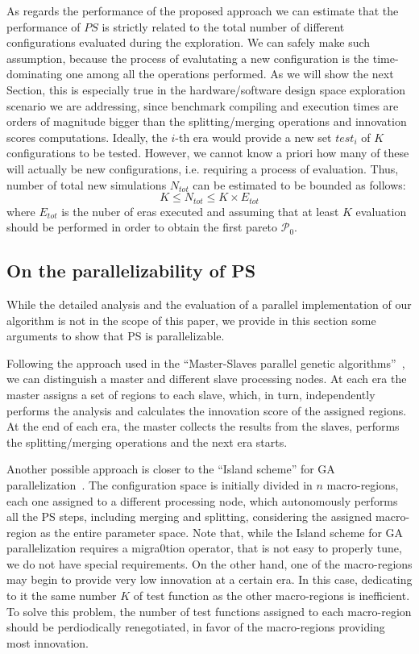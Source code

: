 As regards the performance of the proposed approach we can estimate that the
performance of $PS$ is strictly related to the total number of
different configurations evaluated during the exploration. We can
safely make such assumption, because the process of evalutating a new
configuration is the time-dominating one among all the operations
performed. As we will show the
next Section, this is especially true in the hardware/software
design space exploration scenario we are addressing, since benchmark compiling and execution times
are orders of magnitude bigger than the splitting/merging operations and
innovation scores computations.  Ideally, the $i$-th era would provide a new set
$test_i$ of $K$ configurations to be tested. However, we cannot know
a priori how many of
these will actually be new configurations, i.e. requiring a process of
evaluation. Thus, number of total new simulations $N_{tot}$ 
can be estimated to be bounded as follows:
\[
K \le N_{tot} \le K \times E_{tot}
\]
where $E_{tot}$ is the nuber of eras executed and assuming that at
least $K$ evaluation should be performed in order to obtain the first
pareto $\mathscr{P}_0$. 


\subsection{On the parallelizability of PS}
While the detailed analysis and the evaluation of a parallel implementation of our algorithm is not in the scope of this paper, we provide in this section some arguments to show that PS is parallelizable. 

Following the approach used in the ``Master-Slaves parallel genetic algorithms''~\cite{Cantu-Paz98asurvey,Borkar14parallel}, we can distinguish a master and different slave processing nodes. At each era the master assigns a set of regions to each slave, which, in turn, independently performs the analysis and calculates the innovation score of the assigned regions. At the end of each era, the master collects the results from the slaves, performs the splitting/merging operations and the next era starts.

Another possible approach is closer to the ``Island scheme'' for GA parallelization~\cite{Borkar14parallel}. The configuration space is initially divided in $n$ macro-regions, each one assigned to a different processing node, which autonomously performs all the PS steps, including merging and splitting, considering the assigned macro-region as the entire parameter space. Note that, while the Island scheme for GA parallelization requires a migra0tion operator, that is not easy to properly tune, we do not have special requirements. On the other hand, one of the macro-regions may begin to provide very low innovation at a certain era. In this case, dedicating to it the same number $K$ of test function as the other macro-regions is inefficient. To solve this problem, the number of test functions assigned to each macro-region should be perdiodically renegotiated, in favor of the macro-regions providing most innovation.

